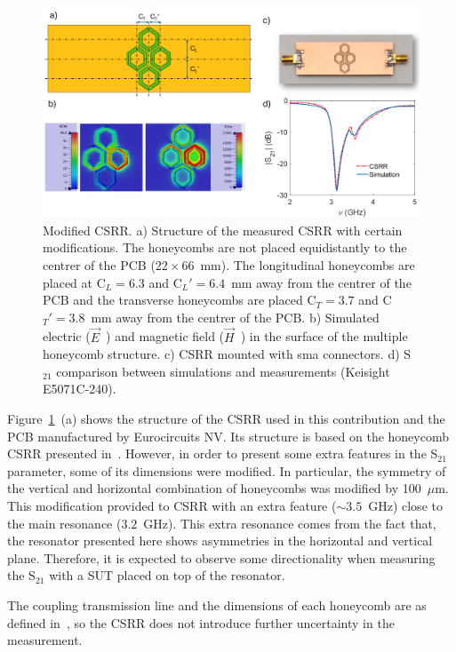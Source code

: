 \documentclass[journal,twoside,web]{ieeecolor}
\begin{document}
\begin{figure}[!t]
	\centering
	\includegraphics [trim = 0mm 0mm 0mm 0mm, clip, width=1\columnwidth]{figures/fig2.png}
	\caption{Modified CSRR. a) Structure of the measured CSRR with certain modifications. The honeycombs are not placed equidistantly to the centrer of the PCB ($22\times66$~mm). The longitudinal honeycombs are placed at C$_{L}=6.3$ and C$_{L}'=6.4$~mm away from the centrer of the PCB and the transverse honeycombs are placed C$_{T}=3.7$ and C$_{T}'=3.8$~mm away from the centrer of the PCB. b) Simulated electric ($\vec{E}$~) and magnetic field ($\vec{H}$~) in the surface of the multiple honeycomb structure. c) CSRR mounted with sma connectors. d) S$_{21}$ comparison between simulations and measurements (Keisight E5071C-240).}
	\label{fig:csrr}
	\vspace{-0.3cm}
\end{figure}

Figure~\ref{fig:csrr}~(a) shows the structure of the CSRR used in this contribution and the PCB manufactured by Eurocircuits NV. Its structure is based on the honeycomb CSRR presented in~\cite{Omer2020}. However, in order to present some extra features in the S$_{21}$ parameter, some of its dimensions were modified. In particular, the symmetry of the vertical and horizontal combination of honeycombs was modified by 100~$\mu$m. This modification provided to CSRR with an extra feature ($\sim3.5$~GHz) close to the main resonance ($3.2$~GHz). This extra resonance comes from the fact that, the resonator presented here shows asymmetries in the horizontal and vertical plane. Therefore, it is expected to observe some directionality when measuring the S$_{21}$ with a SUT placed on top of the resonator.

The coupling transmission line and the dimensions of each honeycomb are as defined in~\cite{Omer2020}, so the CSRR does not introduce further uncertainty in the measurement.
\end{document}
